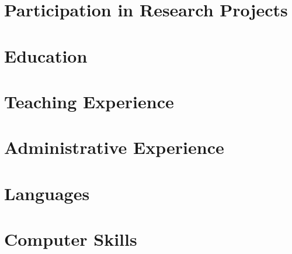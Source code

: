 \documentclass[10pt,a4paper,sans]{moderncv}
\begin{document}
\makecvtitle

\section*{}


\section{Participation in Research Projects}
    \renewcommand{\cventry}[6]{ \oldcventry{#1}{#2}{#3}{#4}{#5}{#6} }

    \renewcommand{\cventry}[6]{ \oldcventry{#1}{#2}{#3}{#4}{}{} }


\section{Education}


\section{Teaching Experience}


\section{Administrative Experience}






\section{Languages}


\section{Computer Skills}


\clearpage
\end{document}

